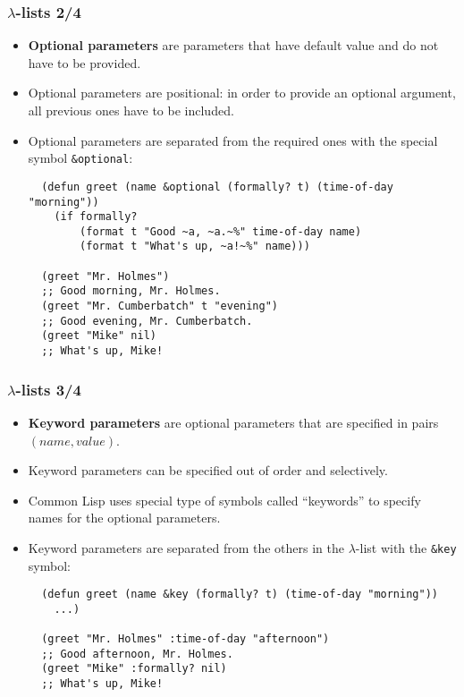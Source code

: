 \documentclass{beamer}
\begin{document}
\begin{frame}[fragile]
  \frametitle{$\lambda$-lists 2/4}
  \begin{itemize}
  \item \textbf{Optional parameters} are parameters that have default value and
    do not have to be provided.
  \item Optional parameters are positional: in order to provide an optional
    argument, all previous ones have to be included.
  \item Optional parameters are separated from the required ones with the special
    symbol \texttt{&optional}:
\begin{verbatim}
  (defun greet (name &optional (formally? t) (time-of-day "morning"))
    (if formally?
        (format t "Good ~a, ~a.~%" time-of-day name) 
        (format t "What's up, ~a!~%" name)))

  (greet "Mr. Holmes")
  ;; Good morning, Mr. Holmes.
  (greet "Mr. Cumberbatch" t "evening")
  ;; Good evening, Mr. Cumberbatch.
  (greet "Mike" nil)
  ;; What's up, Mike!
\end{verbatim}
  \end{itemize}
\end{frame}

\begin{frame}[fragile]
  \frametitle{$\lambda$-lists 3/4}
  \begin{itemize}
  \item \textbf{Keyword parameters} are optional parameters that are specified
    in pairs $(name, value)$.
  \item Keyword parameters can be specified out of order and selectively.
  \item Common Lisp uses special type of symbols called ``keywords'' to specify
    names for the optional parameters.
  \item Keyword parameters are separated from the others in the $\lambda$-list
    with the \texttt{&key} symbol:
\begin{verbatim}
  (defun greet (name &key (formally? t) (time-of-day "morning"))
    ...)

  (greet "Mr. Holmes" :time-of-day "afternoon")
  ;; Good afternoon, Mr. Holmes.
  (greet "Mike" :formally? nil)
  ;; What's up, Mike!
\end{verbatim}
  \end{itemize}
\end{frame}
\end{document}
